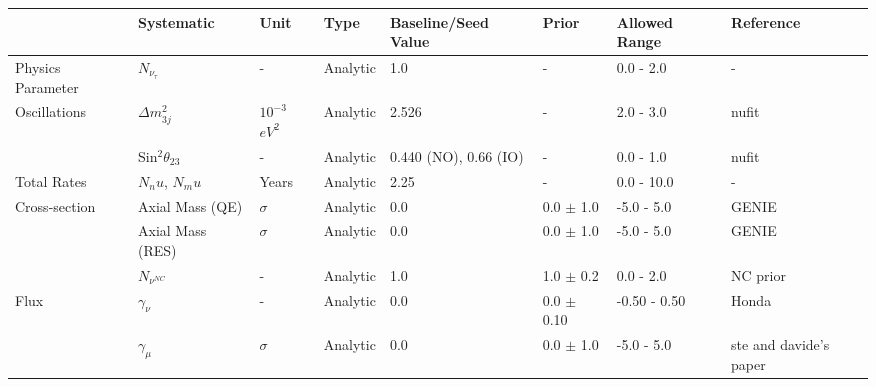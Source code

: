 \begin{landscape}
\begin{table}[]
\centering
\begin{tabular}{@{}llllllll@{}}
\toprule
                               & Systematic                            & Unit                        & Type       & Baseline/Seed Value     & Prior           & Allowed Range & Reference                     \\ \midrule
Physics Parameter    & $N_{\nu_\tau}$                    & -                             & Analytic   & 1.0                     & -                       & 0.0 - 2.0     & -                             \\ \midrule
\multirow{2}{*}{Oscillations}  & $\Delta m^2_{3j}$  & $10^{-3}$ $eV^2$ & Analytic   & 2.526                  & -                      & 2.0 - 3.0     & nufit             \\
                               & Sin$^2 \theta_{23}$            & -                             & Analytic   & 0.440 (NO), 0.66 (IO)   & -              & 0.0 - 1.0     & nufit             \\ \midrule
Total Rates              & $N_nu$, $N_mu$                  & Years                      & Analytic   & 2.25                    & -                      & 0.0 - 10.0    & -                             \\ \midrule
\multirow{3}{*}{Cross-section} & Axial Mass (QE)     & $\sigma$                & Analytic   & 0.0                     & 0.0 $\pm$ 1.0   & -5.0 - 5.0    & GENIE             \\
                               & Axial Mass (RES)                    & $\sigma$               & Analytic   & 0.0                     & 0.0 $\pm$ 1.0   & -5.0 - 5.0    & GENIE             \\
                               & $N_{\nu^{NC}}$                   & -                            & Analytic   & 1.0                     & 1.0 $\pm$ 0.2   & 0.0 - 2.0     & NC prior          \\ \midrule
\multirow{6}{*}{Flux}& $\gamma_\nu$                    & -                            & Analytic   & 0.0                     & 0.0 $\pm$ 0.10  & -0.50 - 0.50  & Honda             \\
                               & $\gamma_\mu$                   & $\sigma$                & Analytic   & 0.0                     & 0.0 $\pm$ 1.0   & -5.0 - 5.0    & ste and davide's paper       \\

\end{tabular}
\end{table}
\end{landscape}
